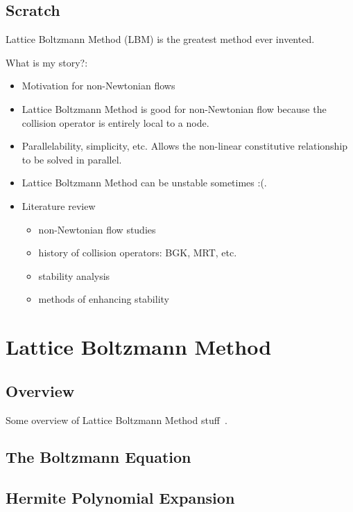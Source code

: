 \documentclass{article}
\begin{document}
{\color{red}
\subsection{Scratch}

Lattice Boltzmann Method (LBM) is the greatest method ever invented.

What is my story?:

\begin{itemize}
	\item Motivation for non-Newtonian flows
	\item Lattice Boltzmann Method is good for non-Newtonian flow because the collision operator is entirely local to a node.
	\item Parallelability, simplicity, etc. Allows the non-linear constitutive relationship to be solved in parallel.
	\item Lattice Boltzmann Method can be unstable sometimes :(.
	\item Literature review
	\begin{itemize}
		\item non-Newtonian flow studies
		\item history of collision operators: BGK, MRT, etc.
		\item stability analysis
		\item methods of enhancing stability
	\end{itemize}
\end{itemize}
}

\section{Lattice Boltzmann Method}

\subsection{Overview}

Some overview of Lattice Boltzmann Method stuff~\cite{grasinger2015simulation}.

\subsection{The Boltzmann Equation}

\subsection{Hermite Polynomial Expansion}
\end{document}
